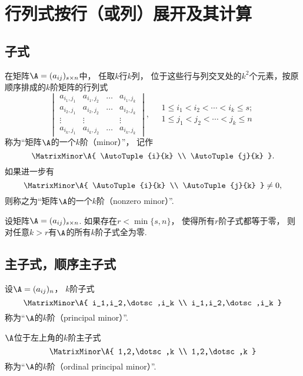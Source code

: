 \section{行列式按行（或列）展开及其计算}
\subsection{子式}
\begin{definition}
在矩阵\(\A=(a_{ij})_{s \times n}\)中，
任取\(k\)行\(k\)列，
位于这些行与列交叉处的\(k^2\)个元素，按原顺序排成的\(k\)阶矩阵的行列式\[
	\begin{vmatrix}
		a_{i_1,j_1} & a_{i_1,j_2} & \dots & a_{i_1,j_k} \\
		a_{i_2,j_1} & a_{i_2,j_2} & \dots & a_{i_2,j_k} \\
		\vdots & \vdots & & \vdots \\
		a_{i_k,j_1} & a_{i_k,j_2} & \dots & a_{i_k,j_k}
	\end{vmatrix},
	\quad
	\begin{array}{c}
		1 \leq i_1 < i_2 < \dotsb < i_k \leq s; \\
		1 \leq j_1 < j_2 < \dotsb < j_k \leq n
	\end{array}
\]称为“矩阵\(\A\)的一个\(k\)阶（minor）”，
记作\[
	\MatrixMinor\A{
		\AutoTuple{i}{k} \\
		\AutoTuple{j}{k}
	}.
\]
如果进一步有\[
	\MatrixMinor\A{
		\AutoTuple{i}{k} \\
		\AutoTuple{j}{k}
	}
	\neq 0,
\]
则称之为“矩阵\(\A\)的一个\(k\)阶（nonzero minor）”.
\end{definition}

\begin{property}
设矩阵\(\A = (a_{ij})_{s \times n}\).
如果存在\(r < \min\{s,n\}\)，
使得所有\(r\)阶子式都等于零，
则对任意\(k > r\)有\(\A\)的所有\(k\)阶子式全为零.
\end{property}

\subsection{主子式，顺序主子式}
\begin{definition}
设\(\A=(a_{ij})_n\)，
\(k\)阶子式\[
	\MatrixMinor\A{
		i_1,i_2,\dotsc,i_k \\
		i_1,i_2,\dotsc,i_k
	}
\]
称为“\(\A\)的\(k\)阶（principal minor）”.

\(\A\)位于左上角的\(k\)阶主子式\[
	\MatrixMinor\A{
		1,2,\dotsc,k \\
		1,2,\dotsc,k
	}
\]称为“\(\A\)的\(k\)阶（ordinal principal minor）”.
\end{definition}

